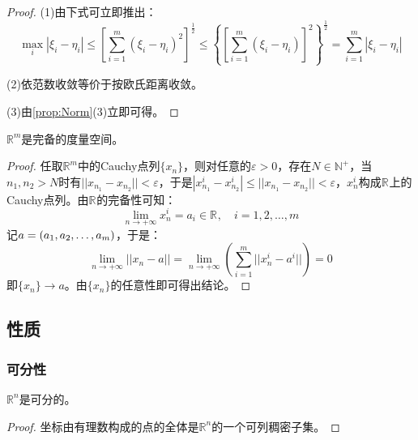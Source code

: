 \begin{proof}
	(1)由下式可立即推出：
	\begin{equation*}
		\max_i|\xi_i-\eta_i|\leqslant	\left[\sum_{i=1}^m(\xi_i-\eta_i)^2\right]^{\frac{1}{2}}\leqslant\left\{\left[\sum_{i=1}^{m}(\xi_i-\eta_i)\right]^2\right\}^{\frac{1}{2}}=\sum_{i=1}^{m}|\xi_i-\eta_i|
	\end{equation*}\par
	(2)依范数收敛等价于按欧氏距离收敛。\par
	(3)由\cref{prop:Norm}(3)立即可得。
\end{proof}
\begin{theorem}
	$\mathbb{R}^{m}$是完备的度量空间。
\end{theorem}
\begin{proof}
	任取$\mathbb{R}^{m}$中的Cauchy点列$\{x_n\}$，则对任意的$\varepsilon>0$，存在$N\in\mathbb{N}^+$，当$n_1,n_2>N$时有$||x_{n_1}-x_{n_2}||<\varepsilon$，于是$|x_{n_1}^i-x_{n_2}^i|\leqslant||x_{n_1}-x_{n_2}||<\varepsilon$，$x_{n}^i$构成$\mathbb{R}^{}$上的Cauchy点列。由$\mathbb{R}^{}$的完备性可知：
	\begin{equation*}
		\lim_{n\to+\infty}x_n^i=a_i\in\mathbb{R}^{},\quad i=1,2,\dots,m
	\end{equation*}
	记$a=(a_1, a_2, \dots, a_{m})$，于是：
	\begin{equation*}
		\lim_{n\to+\infty}||x_n-a||=\lim_{n\to+\infty}\left(\sum_{i=1}^{m}||x_n^i-a^i||\right)=0
	\end{equation*}
	即$\{x_n\}\to  a$。由$\{x_n\}$的任意性即可得出结论。
\end{proof}

\subsection{性质}
\subsubsection{可分性}
\begin{theorem}
	$\mathbb{R}^{n}$是可分的。
\end{theorem}
\begin{proof}
	坐标由有理数构成的点的全体是$\mathbb{R}^{n}$的一个可列稠密子集。
\end{proof}